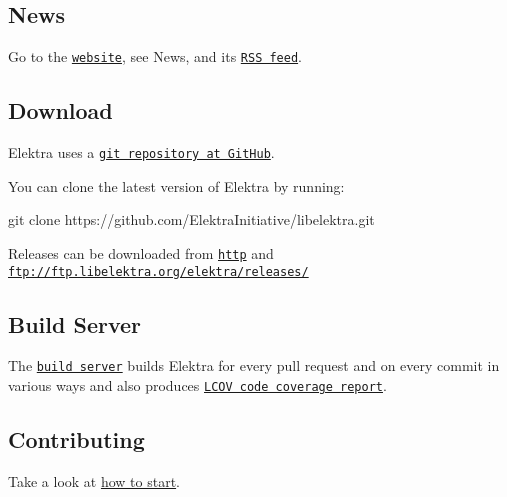 \subsection*{News}

Go to the \href{https://www.libelektra.org}{\tt website}, see News, and its \href{https://www.libelektra.org/news/feed.rss}{\tt R\+SS feed}.

\subsection*{Download}

Elektra uses a \href{https://github.com/ElektraInitiative/libelektra}{\tt git repository at Git\+Hub}.

You can clone the latest version of Elektra by running\+: \begin{DoxyVerb}     git clone https://github.com/ElektraInitiative/libelektra.git
\end{DoxyVerb}


Releases can be downloaded from \href{https://www.libelektra.org/ftp/elektra/releases/}{\tt http} and {\ttfamily \href{ftp://ftp.libelektra.org/elektra/releases/}{\tt ftp\+://ftp.\+libelektra.\+org/elektra/releases/}}

\subsection*{Build Server}

The \href{https://build.libelektra.org/}{\tt build server} builds Elektra for every pull request and on every commit in various ways and also produces \href{https://doc.libelektra.org/coverage/latest}{\tt L\+C\+OV code coverage report}.

\subsection*{Contributing}

Take a look at \hyperlink{doc_IDEAS_md}{how to start}. 